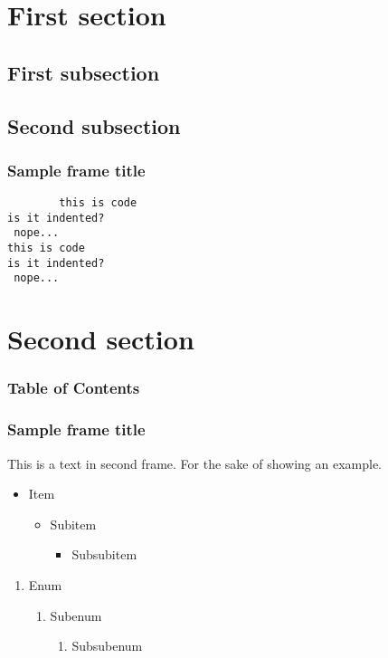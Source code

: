 \documentclass{beamer}
\begin{document}
 
\frame{\titlepage}
 
\section{First section}
\subsection{First subsection}
\subsection{Second subsection}

\begin{frame}[fragile]
	\frametitle{Sample frame title}
	\begin{code}
        \begin{verbatim}
        this is code
is it indented?
 nope...
this is code
is it indented?
 nope...
        \end{verbatim}
    \end{code}
\end{frame}

 \section{Second section}
\begin{frame}
\frametitle{Table of Contents}
\tableofcontents
\end{frame}

\begin{frame}
\frametitle{Sample frame title}
This is a text in second frame. 
For the sake of showing an example.
 
\begin{itemize}
  \item Item
  \begin{itemize}
      \item Subitem
      \begin{itemize}
          \item Subsubitem
      \end{itemize}
  \end{itemize}
\end{itemize}

\begin{enumerate}
    \item Enum
    \begin{enumerate}
        \item Subenum
        \begin{enumerate}
            \item Subsubenum
        \end{enumerate}
    \end{enumerate}
\end{enumerate}

\end{frame}
\end{document}
